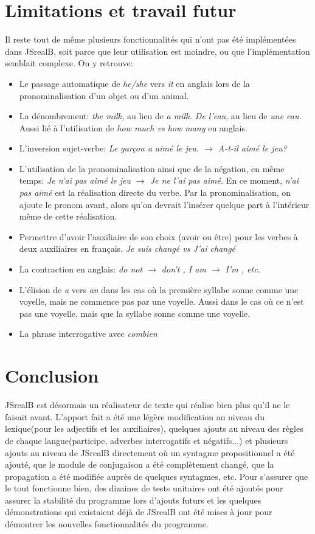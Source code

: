 \documentclass[11pt]{article} %
\newcommand{\system}[1]{\textsf{#1}}
\newcommand{\JSB}{\system{JSrealB}}
\begin{document}
\section{Limitations et travail futur}
Il reste tout de même plusieurs fonctionnalités qui n'ont pas été
implémentées dans \JSB{}, soit parce que leur utilisation est moindre,
ou que l'implémentation semblait complexe. On y retrouve:
\begin{itemize}
\item Le passage automatique de \emph{he/she} vers \emph{it} en anglais
lors de la pronominalisation d'un objet ou d'un animal.
\item La dénombrement: \emph{the milk, }au lieu de \emph{a milk. De l'eau},
au lieu de \emph{une eau. }Aussi lié à l'utilisation de \emph{how much
vs how many }en anglais.
\item L'inversion sujet-verbe: \emph{Le garçon a aimé le jeu. $\rightarrow$ A-t-il
aimé le jeu?}
\item L'utilisation de la pronominalisation ainsi que de la négation, en
même temps: \emph{Je n'ai pas aimé le jeu $\rightarrow$ Je ne l'ai pas aimé.
}En ce moment, \emph{n'ai pas aimé} est la réalisation directe du
verbe. Par la pronominalisation, on ajoute le pronom avant, alors
qu'on devrait l'insérer quelque part à l'intérieur même de cette réalisation.
\item Permettre d'avoir l'auxiliaire de son choix (avoir ou être) pour les
verbes à deux auxiliaires en français. \emph{Je suis changé vs J'ai
changé}

\item La contraction en anglais: \emph{do not $\rightarrow$ don't , I am $\rightarrow$ I'm , etc.}
\item L'élision de \emph{a} vers \emph{an} dans les cas où la première syllabe sonne comme une voyelle,
mais ne commence pas par une voyelle. Aussi dans le cas où ce n'est pas une voyelle, mais que la syllabe
sonne comme une voyelle.
\item La phrase interrogative avec \emph{combien}
\end{itemize}
\section{Conclusion}
\JSB{} est désormais un réalisateur de texte qui réalise bien plus
qu'il ne le faisait avant. L'apport fait a été une légère
modification au niveau du lexique(pour les adjectifs et les auxiliaires),
quelques ajouts au niveau des règles de chaque langue(participe, adverbes
interrogatifs et négatifs...) et plusieurs ajouts au niveau de \JSB{}
directement où un syntagme propositionnel a été ajouté, que le module
de conjugaison a été complètement changé, que la propagation a été
modifiée auprès de quelques syntagmes, etc. Pour s'assurer que le
tout fonctionne bien, des dizaines de tests unitaires ont été ajoutés pour assurer
la stabilité du programme lors d'ajouts futurs et les quelques démonstrations
qui existaient déjà de \JSB{} ont été mises à jour pour démontrer
les nouvelles fonctionnalités du programme.
\end{document}
